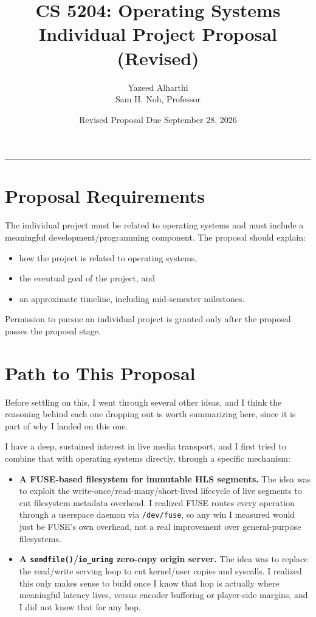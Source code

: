 \documentclass[12pt,letterpaper]{article}
\title{CS 5204: Operating Systems \\ Individual Project Proposal (Revised)}
\author{Yazeed Alharthi \\ Sam H. Noh, Professor}
\date{Revised Proposal Due September 28, 2026}
\begin{document}
\maketitle

\begin{center}
  \rule{0.9\textwidth}{0.4pt}
\end{center}

\section*{Proposal Requirements}

The individual project must be related to operating systems and must include a meaningful development/programming component. The proposal should explain:

\begin{itemize}
    \item how the project is related to operating systems,
    \item the eventual goal of the project, and
    \item an approximate timeline, including mid-semester milestones.
\end{itemize}

Permission to pursue an individual project is granted only after the proposal passes the proposal stage.

\section*{Path to This Proposal}

Before settling on this, I went through several other ideas, and I think the reasoning behind each one dropping out is worth summarizing here, since it is part of why I landed on this one.

I have a deep, sustained interest in live media transport, and I first tried to combine that with operating systems directly, through a specific mechanism:

\begin{itemize}
    \item \textbf{A FUSE-based filesystem for immutable HLS segments.} The idea was to exploit the write-once/read-many/short-lived lifecycle of live segments to cut filesystem metadata overhead. I realized FUSE routes every operation through a userspace daemon via \texttt{/dev/fuse}, so any win I measured would just be FUSE's own overhead, not a real improvement over general-purpose filesystems.
    \item \textbf{A \texttt{sendfile()}/\texttt{io\_uring} zero-copy origin server.} The idea was to replace the read/write serving loop to cut kernel/user copies and syscalls. I realized this only makes sense to build once I know that hop is actually where meaningful latency lives, versus encoder buffering or player-side margins, and I did not know that for any hop.
\end{itemize}
\end{document}
